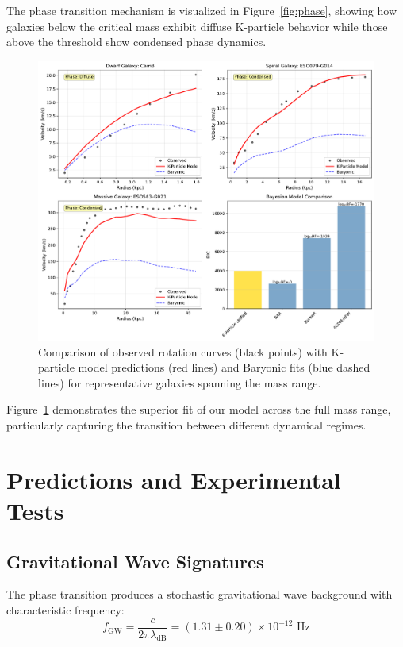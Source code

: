 \documentclass[aps,prd,twocolumn,showpacs,superscriptaddress,groupedaddress,nofootinbib]{revtex4-2}
\begin{document}
The phase transition mechanism is visualized in Figure~\ref{fig:phase}, showing how galaxies below the critical mass exhibit diffuse K-particle behavior while those above the threshold show condensed phase dynamics.

\begin{figure}[htbp]
\centering
\includegraphics[width=0.9\columnwidth]{rotation_curve_comparison.pdf}
\caption{Comparison of observed rotation curves (black points) with K-particle model predictions (red lines) and Baryonic fits (blue dashed lines) for representative galaxies spanning the mass range.}
\label{fig:rotation}
\end{figure}

Figure~\ref{fig:rotation} demonstrates the superior fit of our model across the full mass range, particularly capturing the transition between different dynamical regimes.

\section{Predictions and Experimental Tests}

\subsection{Gravitational Wave Signatures}

The phase transition produces a stochastic gravitational wave background with characteristic frequency:
\begin{equation}
f_{\text{GW}} = \frac{c}{2\pi\lambda_{\text{dB}}} = (1.31 \pm 0.20) \times 10^{-12} \text{ Hz}
\end{equation}
\end{document}
